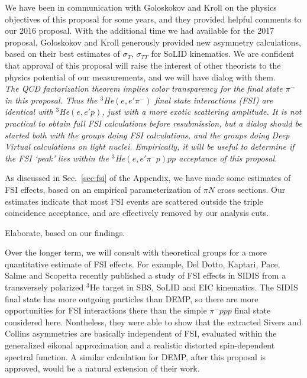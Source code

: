 We have been in communication with Goloskokov and Kroll on the physics
objectives of this proposal for some years, and they provided helpful comments
to our 2016 proposal.  With the additional time we had available for the 2017
proposal, Goloskokov and Kroll generously provided new asymmetry calculations,
based on their best estimates of $\sigma_T$, $\sigma_{TT}$ for SoLID
kinematics.  We are confident that approval of this proposal will raise the
interest of other theorists to the physics potential of our measurements, and
we will have dialog with them.
\\[0.2ex]

{\it The QCD factorization theorem implies color transparency for the final
  state $\pi^-$ in this proposal.  Thus the $^3$He$(e,e'\pi^-)$ final state 
  interactions (FSI) are identical with $^3$He$(e,e'p)$, just with a more exotic
  scattering amplitude.  It is not practical to obtain full FSI calculations
  before resubmission, but a dialog should be started both with the groups
  doing FSI calculations, and the groups doing Deep Virtual calculations on
  light nuclei.  Empirically, it will be useful to determine if the FSI `peak'
  lies within the $^3$He$(e,e'\pi^-p)pp$ acceptance of this proposal.}

As discussed in Sec.~\ref{sec:fsi} of the Appendix, we have made some estimates
of FSI effects, based on an empirical parameterization of $\pi N$ cross
sections.  Our estimates indicate that most FSI events are scattered outside
the triple coincidence acceptance, and are effectively removed by our analysis
cuts.

Elaborate, based on our findings.

Over the longer term, we will consult with theoretical groups for a more
quantitative estimate of FSI effects.  For example, Del Dotto, Kaptari, Pace,
Salme and Scopetta recently published a study of FSI effects in SIDIS from a
transversely polarized $^3$He target \cite{dotto} in SBS, SoLID and EIC
kinematics.  The SIDIS final state has more outgoing particles than DEMP, so
there are more opportunities for FSI interactions there than the simple $\pi^-
ppp$ final state considered here.  Nontheless, they were able to show that the
extracted Sivers and Collins asymmetries are basically independent of FSI,
evaluated within the generalized eikonal approximation and a realistic
distorted spin-dependent spectral function.  A similar calculation for DEMP,
after this proposal is approved, would be a natural extension of their work.
